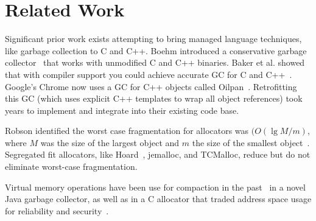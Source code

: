 \section{Related Work}
\label{sec:related-work}

Significant prior work exists attempting to bring managed language
techniques, like garbage collection to C and C++.  Boehm introduced a
conservative garbage collector~\cite{boehm:1988:uncooperative} that
works with unmodified C and C++ binaries.  Baker et al. showed that
with compiler support you could achieve accurate GC for C and
C++~\cite{baker:2009:accurategc}.  Google's Chrome now uses a GC for
C++ objects called Oilpan~\cite{google:oilpan}.  Retrofitting this GC
(which uses explicit C++ templates to wrap all object references) took
years to implement and integrate into their existing code base.

Robson identified the worst case fragmentation for allocators was
$(O(\lg{M/m})$, where $M$ was the size of the largest object and $m$
the size of the smallest object~\cite{robson:1977:worstcasefrag}.
Segregated fit allocators, like Hoard~\cite{379232}, jemalloc, and
TCMalloc, reduce but do not eliminate worst-case fragmentation.

Virtual memory operations have been use for compaction in the
past~\cite{wegiel:2008:mapping-collector} in a novel Java garbage
collector, as well as in a C allocator that traded address space usage
for reliability and security~\cite{1346296}.






